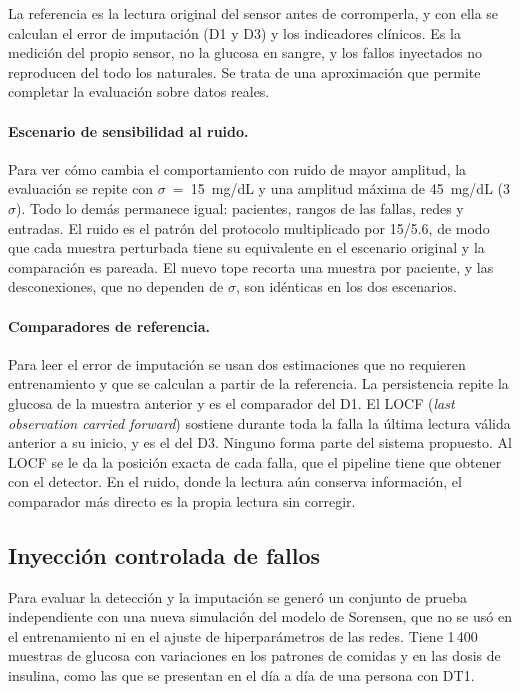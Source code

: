 \documentclass{report}
\begin{document}
La referencia es la lectura original del sensor antes de corromperla, y con ella se calculan el error de imputación (D1 y D3) y los indicadores clínicos. Es la medición del propio sensor, no la glucosa en sangre, y los fallos inyectados no reproducen del todo los naturales. Se trata de una aproximación que permite completar la evaluación sobre datos reales.

\paragraph{Escenario de sensibilidad al ruido.} Para ver cómo cambia el comportamiento con ruido de mayor amplitud, la evaluación se repite con $\sigma$~=~15~mg/dL y una amplitud máxima de 45~mg/dL (3$\sigma$). Todo lo demás permanece igual: pacientes, rangos de las fallas, redes y entradas. El ruido es el patrón del protocolo multiplicado por 15/5.6, de modo que cada muestra perturbada tiene su equivalente en el escenario original y la comparación es pareada. El nuevo tope recorta una muestra por paciente, y las desconexiones, que no dependen de $\sigma$, son idénticas en los dos escenarios.

\paragraph{Comparadores de referencia.} Para leer el error de imputación se usan dos estimaciones que no requieren entrenamiento y que se calculan a partir de la referencia. La persistencia repite la glucosa de la muestra anterior y es el comparador del D1. El LOCF (\textit{last observation carried forward}) sostiene durante toda la falla la última lectura válida anterior a su inicio, y es el del D3. Ninguno forma parte del sistema propuesto. Al LOCF se le da la posición exacta de cada falla, que el pipeline tiene que obtener con el detector. En el ruido, donde la lectura aún conserva información, el comparador más directo es la propia lectura sin corregir.

\subsection{Inyección controlada de fallos}
\label{subsec:inyeccion_fallos}

Para evaluar la detección y la imputación se generó un conjunto de prueba independiente con una nueva simulación del modelo de Sorensen, que no se usó en el entrenamiento ni en el ajuste de hiperparámetros de las redes. Tiene 1\,400 muestras de glucosa con variaciones en los patrones de comidas y en las dosis de insulina, como las que se presentan en el día a día de una persona con DT1.
\end{document}

